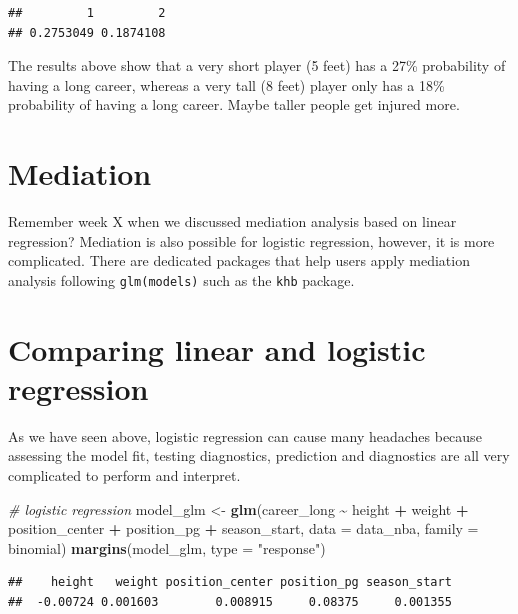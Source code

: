 \documentclass[
]{book}
\newenvironment{Shaded}{\begin{snugshade}}{\end{snugshade}}
\newcommand{\AttributeTok}[1]{\textcolor[rgb]{0.13,0.29,0.53}{#1}}
\newcommand{\CommentTok}[1]{\textcolor[rgb]{0.56,0.35,0.01}{\textit{#1}}}
\newcommand{\FunctionTok}[1]{\textcolor[rgb]{0.13,0.29,0.53}{\textbf{#1}}}
\newcommand{\NormalTok}[1]{#1}
\newcommand{\OtherTok}[1]{\textcolor[rgb]{0.56,0.35,0.01}{#1}}
\newcommand{\SpecialCharTok}[1]{\textcolor[rgb]{0.81,0.36,0.00}{\textbf{#1}}}
\newcommand{\StringTok}[1]{\textcolor[rgb]{0.31,0.60,0.02}{#1}}
\begin{document}
\begin{verbatim}
##         1         2 
## 0.2753049 0.1874108
\end{verbatim}

The results above show that a very short player (5 feet) has a 27\% probability of having a long career, whereas a very tall (8 feet) player only has a 18\% probability of having a long career. Maybe taller people get injured more.

\hypertarget{mediation-1}{%
\section{Mediation}\label{mediation-1}}

Remember week X when we discussed mediation analysis based on linear regression?
Mediation is also possible for logistic regression, however, it is more complicated.
There are dedicated packages that help users apply mediation analysis following
\texttt{glm(models)} such as the \texttt{khb} package.

\hypertarget{comparing-linear-and-logistic-regression}{%
\section{Comparing linear and logistic regression}\label{comparing-linear-and-logistic-regression}}

As we have seen above, logistic regression can cause many headaches because
assessing the model fit, testing diagnostics, prediction and diagnostics are
all very complicated to perform and interpret.

\begin{Shaded}
\begin{Highlighting}[]
\CommentTok{\# logistic regression}
\NormalTok{model\_glm }\OtherTok{\textless{}{-}} \FunctionTok{glm}\NormalTok{(career\_long }\SpecialCharTok{\textasciitilde{}}\NormalTok{ height }\SpecialCharTok{+}\NormalTok{ weight }\SpecialCharTok{+}\NormalTok{ position\_center }\SpecialCharTok{+}\NormalTok{ position\_pg }\SpecialCharTok{+}
\NormalTok{                      season\_start,}
                    \AttributeTok{data =}\NormalTok{ data\_nba,}
                    \AttributeTok{family =}\NormalTok{ binomial)}
\FunctionTok{margins}\NormalTok{(model\_glm, }\AttributeTok{type =} \StringTok{"response"}\NormalTok{)}
\end{Highlighting}
\end{Shaded}

\begin{verbatim}
##    height   weight position_center position_pg season_start
##  -0.00724 0.001603        0.008915     0.08375     0.001355
\end{verbatim}
\end{document}
